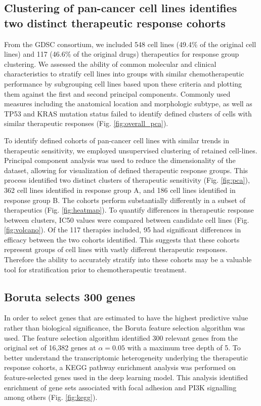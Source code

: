 \documentclass[10pt, letterpaper]{article}
\begin{document}
\begin{multicols*}{2}
\subsection*{Clustering of pan-cancer cell lines identifies two distinct therapeutic response cohorts}
From the GDSC consortium, we included 548 cell lines (49.4\% of the original cell lines) and 117 (46.6\% of the original drugs) therapeutics for response group clustering. We assessed the ability of common molecular and clinical characteristics to stratify cell lines into groups with similar chemotherapeutic performance by subgrouping cell lines based upon these criteria and plotting them against the first and second principal components. Commonly used measures including the anatomical location and morphologic subtype, as well as TP53 and KRAS mutation status failed to identify defined clusters of cells with similar therapeutic responses (Fig. \ref{fig:overall_pca}).

To identify defined cohorts of pan-cancer cell lines with similar trends in therapeutic sensitivity, we employed unsupervised clustering of retained cell-lines. Principal component analysis was used to reduce the dimensionality of the dataset, allowing for visualization of defined therapeutic response groups. This process identified two distinct clusters of therapeutic sensitivity (Fig. \ref{fig:pca}), 362 cell lines identified in response group A, and 186 cell lines identified in response group B. The cohorts perform substantially differently in a subset of therapeutics (Fig. \ref{fig:heatmap}). To quantify differences in therapeutic response between clusters, IC50 values were compared between candidate cell lines (Fig. \ref{fig:volcano}). Of the 117 therapies included, 95 had significant differences in efficacy between the two cohorts identified. This suggests that these cohorts represent groups of cell lines with vastly different therapeutic responses. Therefore the ability to accurately stratify into these cohorts may be a valuable tool for stratification prior to chemotherapeutic treatment. 


\subsection*{Boruta selects 300 genes}
In order to select genes that are estimated to have the highest predictive value rather than biological significance, the Boruta feature selection algorithm was used. The feature selection algorithm identified 300 relevant genes from the original set of 16,382 genes at $\alpha=0.05$ with a maximum tree depth of 5. To better understand the transcriptomic heterogeneity underlying the therapeutic response cohorts, a KEGG pathway enrichment analysis was performed on feature-selected genes used in the deep learning model. This analysis identified enrichment of gene sets associated with focal adhesion and PI3K signalling among others (Fig. \ref{fig:kegg}).



\end{multicols*}
\end{document}
